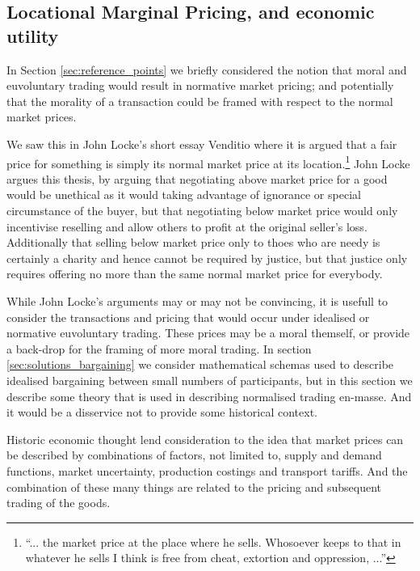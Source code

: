 \subsection{Locational Marginal Pricing, and economic utility}

In Section \ref{sec:reference_points} we briefly considered the notion that moral and euvoluntary trading would result in normative market pricing; and potentially that the morality of a transaction could be framed with respect to the normal market prices.

We saw this in John Locke's short essay Venditio \cite{locke2003locke} where it is argued that a fair price for something is simply its normal market price at its location.\footnote{``... the market price at the place where he sells. Whosoever keeps to that in whatever he sells I think is free from cheat, extortion and oppression, ...''}
John Locke argues this thesis, by arguing that negotiating above market price for a good would be unethical as it would taking advantage of ignorance or special circumstance of the buyer, but that negotiating below market price would only incentivise reselling and allow others to profit at the original seller's loss.
Additionally that selling below market price only to thoes who are needy is certainly a charity and hence cannot be required by justice, but that justice only requires offering no more than the same normal market price for everybody.

While John Locke's arguments may or may not be convincing, it is usefull to consider the transactions and pricing that would occur under idealised or normative euvoluntary trading.
These prices may be a moral themself, or provide a back-drop for the framing of more moral trading.
In section \ref{sec:solutions_bargaining} we consider mathematical schemas used to describe idealised bargaining between small numbers of participants, but in this section we describe some theory that is used in describing normalised trading en-masse.
And it would be a disservice not to provide some historical context.

Historic economic thought lend consideration to the idea that market prices can be described by combinations of factors, not limited to, supply and demand functions, market uncertainty, production costings and transport tariffs.
And the combination of these many things are related to the pricing and subsequent trading of the goods.

